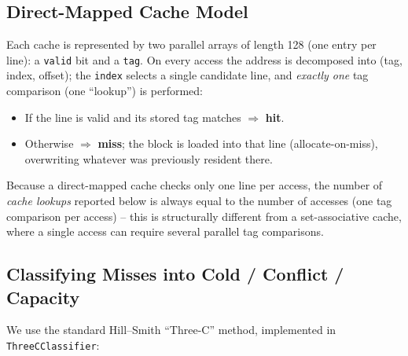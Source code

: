 \documentclass[11pt]{article}
\begin{document}
\subsection{Direct-Mapped Cache Model}

Each cache is represented by two parallel arrays of length 128 (one
entry per line): a \texttt{valid} bit and a \texttt{tag}. On every
access the address is decomposed into (tag, index, offset); the
\texttt{index} selects a single candidate line, and \emph{exactly one}
tag comparison (one ``lookup'') is performed:

\begin{itemize}[leftmargin=1.6em]
  \item If the line is valid and its stored tag matches $\Rightarrow$ \textbf{hit}.
  \item Otherwise $\Rightarrow$ \textbf{miss}; the block is loaded into
        that line (allocate-on-miss), overwriting whatever was
        previously resident there.
\end{itemize}

Because a direct-mapped cache checks only one line per access, the
number of \emph{cache lookups} reported below is always equal to the
number of accesses (one tag comparison per access) -- this is
structurally different from a set-associative cache, where a single
access can require several parallel tag comparisons.

\subsection{Classifying Misses into Cold / Conflict / Capacity}

We use the standard Hill--Smith ``Three-C'' method, implemented in
\texttt{ThreeCClassifier}:
\end{document}
